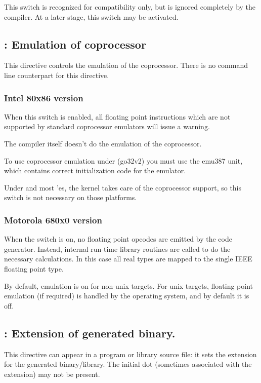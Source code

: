 This switch is recognized for compatibility only, but is ignored completely
by the compiler. At a later stage, this switch may be activated.

\subsection{ : Emulation of coprocessor}

This directive controls the emulation of the coprocessor. There is no
command line counterpart for this directive.

\subsubsection{Intel 80x86 version}

When this switch is enabled, all floating point instructions
which are not supported by standard coprocessor emulators will issue
a warning.

The compiler itself doesn't do the emulation of the coprocessor.

To use coprocessor emulation under \dos (go32v2) you must use the
emu387 unit, which contains correct initialization code for the
emulator.

Under \linux and most \unix'es, the kernel takes care of the
coprocessor support, so this switch is not necessary on those platforms.

\subsubsection{Motorola 680x0 version}

When the switch is on, no floating point opcodes are emitted
by the code generator. Instead, internal run-time library routines
are called to do the necessary calculations. In this case all
real types are mapped to the single IEEE floating point type.

\begin{remark}By default, emulation is on for non-unix targets. 
For unix targets, floating point emulation (if required) is handled
by the operating system, and by default it is off.
\end{remark}
\subsection{ : Extension of generated binary.}
This directive can appear in a program or library source file: it sets the
extension for the generated binary/library. The initial dot (sometimes
associated with the extension) may not be present.


